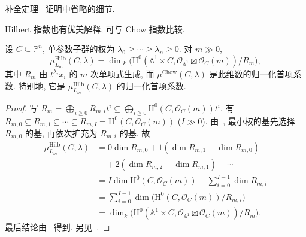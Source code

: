 \begin{exercise}[细节]\label{src:6.8.15}
补全定理~ 证明中省略的细节.
\end{exercise}
Hilbert 指数也有优美解释, 可与 Chow 指数比较.
\begin{proposition}\label{src:6.8.16}
设 $C\subseteq\mathbb P^n$, 单参数子群的权为 $\lambda_0\geq\cdots\geq\lambda_n\geq0$. 对 $m\gg0$,
\[
\mu_{L_m}^{\mathrm{Hilb}}(C,\lambda)
=\dim_k\bigl(\mathrm H^0(\mathbb A^1\times C,\mathcal O_{\mathbb A^1}\boxtimes\mathcal O_C(m))/R_m\bigr),
\]
其中 $R_m$ 由 $t^{\lambda_i}x_i$ 的 $m$ 次单项式生成, 而 $\mu^{\mathrm{Chow}}(C,\allowbreak \lambda)$ 是此维数的归一化首项系数. 特别地, 它是 $\mu_{L_m}^{\mathrm{Hilb}}(C,\allowbreak \lambda)$ 的归一化首项系数.
\end{proposition}
\begin{proof}
写 $R_m=\bigoplus_{i\geq0}R_{m,\allowbreak i}t^i\subseteq\bigoplus_{i\geq0}\mathrm H^0(C,\allowbreak \mathcal O_C(m))t^i$. 有 $R_{m,\allowbreak 0}\subseteq R_{m,\allowbreak 1}\subseteq\cdots\subseteq R_{m,\allowbreak I}=\mathrm H^0(C,\allowbreak \mathcal O_C(m))$ ($I\gg0$). 由~, 最小权的基先选择 $R_{m,\allowbreak 0}$ 的基, 再依次扩充为 $R_{m,\allowbreak i}$ 的基. 故
\[
\begin{aligned}
\mu_{L_m}^{\mathrm{Hilb}}(C,\lambda)
&=0\dim R_{m,0}+1(\dim R_{m,1}-\dim R_{m,0})\\
&\quad+2(\dim R_{m,2}-\dim R_{m,1})+\cdots\\
&=I\dim\mathrm H^0(C,\mathcal O_C(m))-\sum_{i=0}^{I-1}\dim R_{m,i}\\
&=\sum_{i=0}^{I-1}\dim\bigl(\mathrm H^0(C,\mathcal O_C(m))/R_{m,i}\bigr)\\
&=\dim_k\bigl(\mathrm H^0(\mathbb A^1\times C,\mathcal O_{\mathbb A^1}\boxtimes\mathcal O_C(m))/R_m\bigr).
\end{aligned}
\]
最后结论由~ 得到. 另见~\cite[命题 3.2]{Mor80}.
\end{proof}

